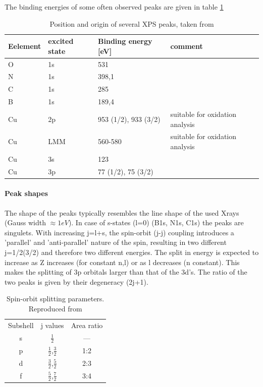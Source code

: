 The  binding energies of some often observed peaks are given in table \ref{tab:XPS-intensities}
\begin{table}\centering
 \caption{Position and origin of several XPS peaks, taken from\cite{wanger_handbook_1979}}
 \begin{tabular}{llll}
  Eelement & excited state & Binding energy [eV]& comment\\ \hline \hline
  O & 1s & 531&\\
  N & 1s & 398,1&\\
  C & 1s & 285&\\
  B & 1s & 189,4& \\
  Cu & 2p & 953 (1/2), 933 (3/2) & suitable for oxidation analysis\\
  Cu & LMM & 560-580 & suitable for oxidation analysis\\
  Cu & 3s & 123 &\\
  Cu & 3p & 77 (1/2), 75 (3/2) & \\
 \end{tabular}
\label{tab:XPS-intensities}
\end{table}
\paragraph{Peak shapes}
The shape of the peaks typically resembles the line shape of the used Xrays (Gauss width $\approx 1eV$). In case of s-states (l=0) (B1s, N1s, C1s) the peaks are singulets. With increasing j=l+s, the spin-orbit (j-j) coupling introduces a 'parallel' and 'anti-parallel' nature of the spin, resulting in two different j=1/2(3/2) and therefore two different energies. The split in energy is expected to increase as Z increases (for constant n,l) or as l decreases (n constant). This makes the splitting of 3p orbitals larger than that of the 3d's. The ratio of the two peaks is given by their degeneracy (2j+1).\cite[113]{Riviere_90}
\begin{table}
\caption{Spin-orbit splitting parameters. Reproduced from \cite{Riviere_90}}
\centering
 \begin{tabular}{ccc}
 Subshell & j values & Area ratio \\
 s & $\frac{1}{2}$ & --- \\
 p & $\frac{1}{2}$,$\frac{3}{2}$ & 1:2 \\
 d & $\frac{3}{2}$,$\frac{5}{2}$ & 2:3 \\
 f & $\frac{5}{2}$,$\frac{7}{2}$ & 3:4 \\
 \end{tabular}
\end{table}


